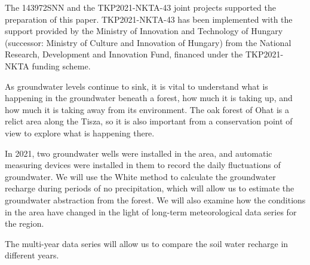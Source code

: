 The 143972SNN and the TKP2021-NKTA-43 joint projects supported the preparation of this paper. TKP2021-NKTA-43 has been implemented with the support provided by the Ministry of Innovation and Technology of Hungary (successor: Ministry of Culture and Innovation of Hungary) from the National Research, Development and Innovation Fund, financed under the TKP2021-NKTA funding scheme.





\newpage{}
{}
\begin{flushleft}





\end{flushleft}

\noindent

As groundwater levels continue to sink, it is vital to understand what is happening in the groundwater beneath a forest, how much it is taking up, and how much it is taking away from its environment. The oak forest of Ohat is a relict area along the Tisza, so it is also important from a conservation point of view to explore what is happening there.

In 2021, two groundwater wells were installed in the area, and automatic measuring devices were installed in them to record the daily fluctuations of groundwater. We will use the White method to calculate the groundwater recharge during periods of no precipitation, which will allow us to estimate the groundwater abstraction from the forest. We will also examine how the conditions in the area have changed in the light of long-term meteorological data series for the region.

The multi-year data series will allow us to compare the soil water recharge in different years.

